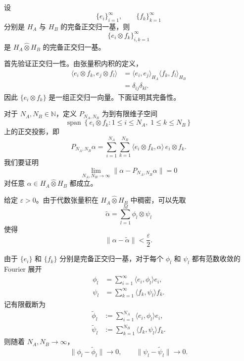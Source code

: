 \documentclass[UTF8,a4paper,11pt,openany]{ctexbook}
\begin{document}
\begin{proposition}[张量积空间的完备正交归一基]
设
\[
\{e_i\}_{i=1}^{\infty},
\qquad
\{f_k\}_{k=1}^{\infty}
\]
分别是 $H_A$ 与 $H_B$ 的完备正交归一基，则
\begin{equation}
    \{e_i\otimes f_k\}_{i,k=1}^{\infty}
\end{equation}
是 $H_A\widehat{\otimes}H_B$ 的完备正交归一基。
\end{proposition}

\begin{proofblock}
首先验证正交归一性。由张量积内积的定义，
\begin{align}
    \langle e_i\otimes f_k,e_j\otimes f_l\rangle
    &=
    \langle e_i,e_j\rangle_{H_A}
    \langle f_k,f_l\rangle_{H_B}
    \nonumber\\
    &=
    \delta_{ij}\delta_{kl}.
\end{align}
因此 $\{e_i\otimes f_k\}$ 是一组正交归一向量。下面证明其完备性。

对于 $N_A,N_B\in\mathbb N$，定义
$P_{N_A,N_B}$ 为到有限维子空间
\[
\operatorname{span}
\left\{
    e_i\otimes f_k:
    1\leq i\leq N_A,\;
    1\leq k\leq N_B
\right\}
\]
上的正交投影，即
\begin{equation}
    P_{N_A,N_B}\alpha
    =
    \sum_{i=1}^{N_A}
    \sum_{k=1}^{N_B}
    \langle e_i\otimes f_k,\alpha\rangle\,
    e_i\otimes f_k.
\end{equation}
我们要证明
\begin{equation}
    \lim_{N_A,N_B\to\infty}
    \|
        \alpha-P_{N_A,N_B}\alpha
    \|
    =
    0
\end{equation}
对任意
$\alpha\in H_A\widehat{\otimes}H_B$ 都成立。

给定 $\varepsilon>0$。由于代数张量积在
$H_A\widehat{\otimes}H_B$ 中稠密，可以先取
\begin{equation}
    \widetilde{\alpha}
    =
    \sum_{l=1}^{M}
    \phi_l\otimes\psi_l
\end{equation}
使得
\begin{equation}
    \|\alpha-\widetilde{\alpha}\|
    <
    \frac{\varepsilon}{2}.
\end{equation}

由于 $\{e_i\}$ 和 $\{f_k\}$ 分别是完备正交归一基，对于每个
$\phi_l$ 和 $\psi_l$ 都有范数收敛的 Fourier 展开
\begin{align}
    \phi_l
    &=
    \sum_{i=1}^{\infty}
    \langle e_i,\phi_l\rangle e_i,
    \nonumber\\
    \psi_l
    &=
    \sum_{k=1}^{\infty}
    \langle f_k,\psi_l\rangle f_k.
\end{align}
记有限截断为
\begin{align}
    \widetilde{\phi}_l
    &:=
    \sum_{i=1}^{N_A}
    \langle e_i,\phi_l\rangle e_i,
    \nonumber\\
    \widetilde{\psi}_l
    &:=
    \sum_{k=1}^{N_B}
    \langle f_k,\psi_l\rangle f_k.
\end{align}
则随着 $N_A,N_B\to\infty$，
\begin{equation}
    \|\phi_l-\widetilde{\phi}_l\|\to0,
    \qquad
    \|\psi_l-\widetilde{\psi}_l\|\to0.
\end{equation}


\end{proofblock}
\end{document}
